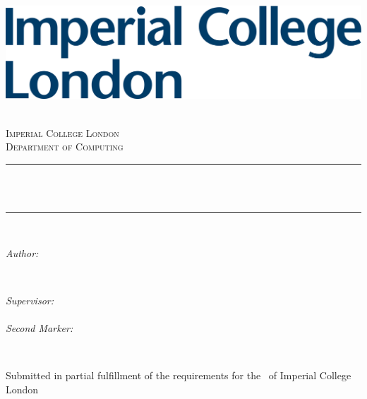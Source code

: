 \begin{titlepage}

\newcommand{\HRule}{\rule{\linewidth}{0.5mm}}
\includegraphics[width=0.4\linewidth]{figures/imperial.png}
\bigskip \bigskip
\center %

\textsc{\LARGE \reporttype}\\[1.5cm]
\textsc{\Large Imperial College London}\\[0.5cm]
\textsc{\large Department of Computing}\\[0.5cm]

\makeatletter
\HRule \\[0.4cm]
{ \huge \bfseries \@title}\\%
\HRule \\[1.5cm]

\begin{minipage}{0.4\textwidth}
\begin{flushleft} \large
\emph{Author:}\\
\@author %
\end{flushleft}
\end{minipage}
~
\begin{minipage}{0.4\textwidth}
\begin{flushright} \large
\emph{Supervisor:} \\
\supervisor \\
\emph{Second Marker:} \\
\secondmarker
\end{flushright}
\end{minipage}\\[2cm]
\makeatother



\vfill %
Submitted in partial fulfillment of the requirements for the \degreetype ~of Imperial College London
    
\end{titlepage}